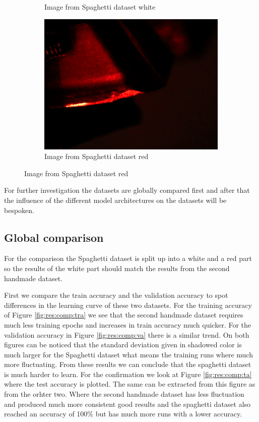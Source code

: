 \begin{figure}[hbtp]
\begin{subfigure}{0.31\textwidth}
				\caption{Image from Spaghetti dataset white}
				\label{fig:res:comp:sd:white}
		\end{subfigure}
		\hspace*{\fill}
		\begin{subfigure}{0.31\textwidth}
			\centering
			\includegraphics[width=\linewidth]{fig/Vision/Dataset/automated_datasets/2_created_datasets/2_Spaghetti_dataset/b_018_p_002_l_006-011_red_nb.png}
				\caption{Image from Spaghetti dataset red}
				\label{fig:res:comp:sd:red}
		\end{subfigure}
	\end{figure}
	
	For further investigation the datasets are globally compared first and after that the influence of the different model architectures on the datasets will be bespoken.

	\subsection{Global comparison}
	For the comparison the Spaghetti dataset is split up into a white and a red part so the results of the white part should match the results from the second handmade dataset. 
	
	First we compare the train accuracy and the validation accuracy to spot differences in the learning curve of these two datasets. For the training accuracy of Figure \ref{fig:res:comp:tra} we see that the second handmade dataset requires much less training epochs and increases in train accuracy much quicker. For the validation accuracy in Figure \ref{fig:res:comp:va} there is a similar trend. On both figures can be noticed that the standard deviation given in shadowed color is much larger for the Spaghetti dataset what means the training runs where much more fluctuating. From these results we can conclude that the spaghetti dataset is much harder to learn. For the confirmation we look at Figure \ref{fig:res:comp:ta} where the test accuracy is plotted. The same can be extracted from this figure as from the orhter two. Where the second handmade dataset has less fluctuation and produced much more consistent good results and the spaghetti dataset also reached an accuracy of 100\% but has much more runs with a lower accuracy. 

